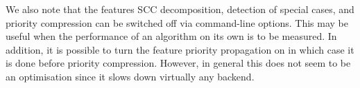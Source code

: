 We also note that the features SCC decomposition, detection of special cases, and priority
compression can be switched off via command-line options. This may be useful when the performance 
of an algorithm on its own is to be measured. In addition, it is possible to turn the feature 
priority propagation on in which case it is done before priority compression. However, in general 
this does not seem to be an optimisation since it slows down virtually any backend.  



